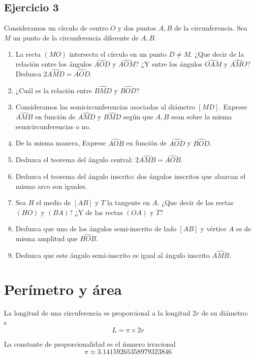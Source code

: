 \subsection{Ejercicio 3}

Consideramos un círculo de centro $O$ y dos puntos $A,B$ de la circunferencia.
Sea $M$ un punto de la circunferencia diferente de $A,B$.

\begin{enumerate}
\item La recta $(MO)$ intersecta el círculo en un punto $D \neq M$.
  ¿Que decir de la relación entre los ángulos $\widehat{AOD}$ y $\widehat{AOM}$?
  ¿Y entre los ángulos $\widehat{OAM}$ y $\widehat{AMO}$?
  Deduzca $2 \widehat{AMD} = \widehat{AOD}$.
\item ¿Cuál es la relación entre $\widehat{BMD}$ y $\widehat{BOD}$?
\item Consideramos las semicircunferencias asociadas al diámetro $[MD]$.
  Exprese $\widehat{AMB}$ en función de
  $\widehat{AMD}$ y $\widehat{BMD}$ según que $A,B$ sean sobre la misma
  semicircunferencias o no.
\item De la misma manera, Exprese $\widehat{AOB}$ en función de
  $\widehat{AOD}$ y $\widehat{BOD}$.
\item Deduzca el teorema del ángulo central: $2 \widehat{AMB} = \widehat{AOB}$.
\item Deduzca el teorema del ángulo inscrito: dos ángulos inscritos que
  abarcan el mismo arco son iguales.
\item Sea $H$ el medio de $[AB]$ y $T$ la tangente en $A$.
  ¿Que decir de las rectas $(HO)$ y $(BA)$?  ¿Y de las rectas $(OA)$ y $T$?
\item Deduzca que uno de los ángulos semi-inscrito de lado $[AB]$ y vértice
  $A$ es de misma amplitud que $\widehat{HOB}$.
\item Deduzca que este ángulo semi-inscrito es igual al ángulo
  inscrito $\widehat{AMB}$.
\end{enumerate}

\section{Perímetro y área}

La longitud de una circuferencia es proporcional a la longitud $2r$ de
su diámetro:
s
$$
L = \pi \times 2r
$$

La constante de proporcionalidad es el ńumero irracional
$$\pi \approx 3.14159265358979323846$$


